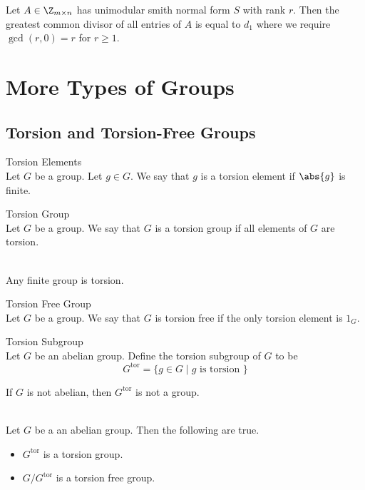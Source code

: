 \documentclass[a4paper]{article}
\begin{document}
\begin{lmm}{}{} Let $A\in\Z_{m\times n}$ has unimodular smith normal form $S$ with rank $r$. Then the greatest common divisor of all entries of $A$ is equal to $d_1$ where we require $\gcd(r,0)=r$ for $r\geq 1$. 
\end{lmm}

\pagebreak
\section{More Types of Groups}
\subsection{Torsion and Torsion-Free Groups}
\begin{defn}{Torsion Elements}{}\\
Let $G$ be a group. Let $g\in G$. We say that $g$ is a torsion element if $\abs{g}$ is finite. 
\end{defn}

\begin{defn}{Torsion Group}{}\\
Let $G$ be a group. We say that $G$ is a torsion group if all elements of $G$ are torsion. 
\end{defn}

\begin{eg}{}{}\\
Any finite group is torsion. 
\end{eg}

\begin{defn}{Torsion Free Group}{}\\
Let $G$ be a group. We say that $G$ is torsion free if the only torsion element is $1_G$. 
\end{defn}

\begin{defn}{Torsion Subgroup}{}\\
Let $G$ be an abelian group. Define the torsion subgroup of $G$ to be $$G^\text{tor}=\{g\in G\;|\;g\text{ is torsion }\}$$
\end{defn}

If $G$ is not abelian, then $G^\text{tor}$ is not a group. 

\begin{lmm}{}{}\\
Let $G$ be a an abelian group. Then the following are true. 
\begin{itemize}
\item $G^\text{tor}$ is a torsion group. 
\item $G/G^\text{tor}$ is a torsion free group. 
\end{itemize}
\end{lmm}
\end{document}
